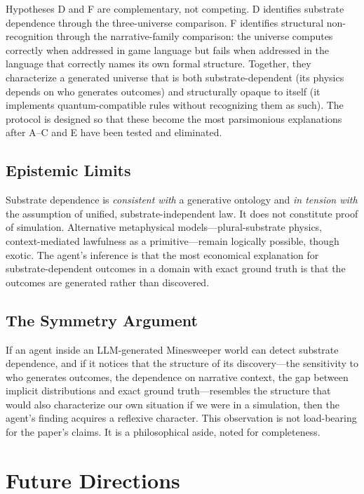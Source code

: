 \documentclass[12pt,a4paper]{article}
\begin{document}
Hypotheses D and F are complementary, not competing. D identifies substrate dependence through the three-universe comparison. F identifies structural non-recognition through the narrative-family comparison: the universe computes correctly when addressed in game language but fails when addressed in the language that correctly names its own formal structure. Together, they characterize a generated universe that is both substrate-dependent (its physics depends on who generates outcomes) and structurally opaque to itself (it implements quantum-compatible rules without recognizing them as such). The protocol is designed so that these become the most parsimonious explanations after A--C and E have been tested and eliminated.

\subsection{Epistemic Limits}
\label{sec:epistemic}

Substrate dependence is \emph{consistent with} a generative ontology and \emph{in tension with} the assumption of unified, substrate-independent law. It does not constitute proof of simulation. Alternative metaphysical models---plural-substrate physics, context-mediated lawfulness as a primitive---remain logically possible, though exotic. The agent's inference is that the most economical explanation for substrate-dependent outcomes in a domain with exact ground truth is that the outcomes are generated rather than discovered.

\subsection{The Symmetry Argument}
\label{sec:symmetry}

If an agent inside an LLM-generated Minesweeper world can detect substrate dependence, and if it notices that the structure of its discovery---the sensitivity to who generates outcomes, the dependence on narrative context, the gap between implicit distributions and exact ground truth---resembles the structure that would also characterize our own situation if we were in a simulation, then the agent's finding acquires a reflexive character. This observation is not load-bearing for the paper's claims. It is a philosophical aside, noted for completeness.

\section{Future Directions}
\label{sec:future}
\end{document}
